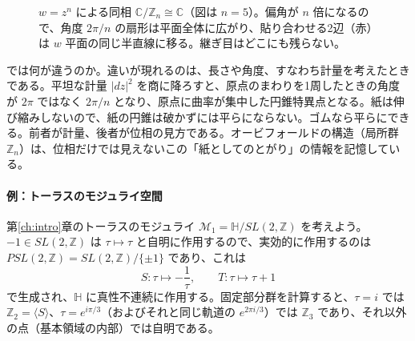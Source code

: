 \documentclass[uplatex, dvipdfmx, book]{jsbook}
\begin{document}
\begin{figure}[htbp]
\centering
{}
\caption{$w = z^n$ による同相 $\mathbb{C}/\mathbb{Z}_n \cong \mathbb{C}$（図は $n = 5$）。偏角が $n$ 倍になるので、角度 $2\pi/n$ の扇形は平面全体に広がり、貼り合わせる2辺（赤）は $w$ 平面の同じ半直線に移る。継ぎ目はどこにも残らない。}
\label{fig:zn-map}
\end{figure}

では何が違うのか。違いが現れるのは、長さや角度、すなわち計量を考えたときである。平坦な計量 $|dz|^2$ を商に降ろすと、原点のまわりを1周したときの角度が $2\pi$ ではなく $2\pi/n$ となり、原点に曲率が集中した円錐特異点となる。紙は伸び縮みしないので、紙の円錐は破かずには平らにならない。ゴムなら平らにできる。前者が計量、後者が位相の見方である。オービフォールドの構造（局所群 $\mathbb{Z}_n$）は、位相だけでは見えないこの「紙としてのとがり」の情報を記憶している。

\paragraph{例：トーラスのモジュライ空間}
第\ref{ch:intro}章のトーラスのモジュライ $\mathcal{M}_1 = \mathbb{H}/SL(2, \mathbb{Z})$ を考えよう。$-1 \in SL(2,\mathbb{Z})$ は $\tau \mapsto \tau$ と自明に作用するので、実効的に作用するのは $PSL(2, \mathbb{Z}) = SL(2, \mathbb{Z})/\{\pm 1\}$ であり、これは
\begin{equation}
    S: \tau \mapsto -\frac{1}{\tau}, \qquad T: \tau \mapsto \tau + 1
\end{equation}
で生成され、$\mathbb{H}$ に真性不連続に作用する。固定部分群を計算すると、$\tau = i$ では $\mathbb{Z}_2 = \langle S \rangle$、$\tau = e^{i\pi/3}$（およびそれと同じ軌道の $e^{2\pi i/3}$）では $\mathbb{Z}_3$ であり、それ以外の点（基本領域の内部）では自明である。
\end{document}

